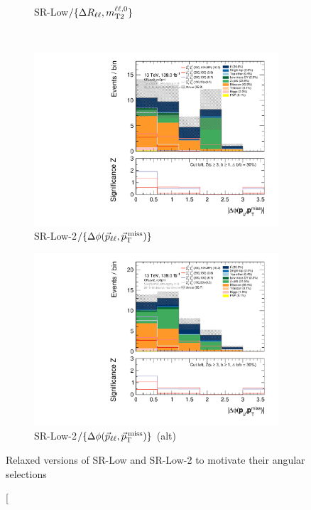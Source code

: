 \begin{figure}[tp]
\begin{subfigure}{0.495\textwidth}
\caption{SR-Low$/\{\Delta R_{\ell\ell},m_\mathrm{T2}^{\ell\ell,0}\}$}
\label{fig:2ljets_low_minus_norll_nomt2_mt2}
\end{subfigure}
\\[0.5em]
\begin{subfigure}{0.495\textwidth}
\centering
\includegraphics[width=\textwidth]{figures/2ljets_low_absdPhiPllMet_SRLow2_noDphi.pdf}
\caption{SR-Low-2$/\{\Delta\phi(\vec p_{\ell\ell}, \vec p_\mathrm{T}^\mathrm{\:miss})\}$}
\label{fig:2ljets_low_minus_dphi}
\end{subfigure}
\hfill
\begin{subfigure}{0.495\textwidth}
\centering
\includegraphics[width=\textwidth]{figures/2ljets_low_absdPhiPllMet_SRLow2_noDphi_mg5.pdf}
\caption{SR-Low-2$/\{\Delta\phi(\vec p_{\ell\ell}, \vec p_\mathrm{T}^\mathrm{\:miss})\}$ (alt)}
\label{fig:2ljets_low_minus_dphi_alt}
\end{subfigure}
\caption[
Relaxed versions of SR-Low and SR-Low-2 to motivate their angular selections

\end{figure}
